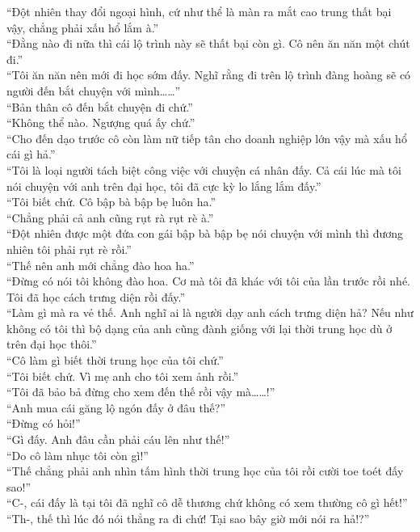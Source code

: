\documentclass[12pt,a4paper, twosides]{book}
\begin{document}
“Đột nhiên thay đổi ngoại hình, cứ như thể là màn ra mắt cao trung thất bại vậy, chẳng phải xấu hổ lắm à.”\\
“Đằng nào đi nữa thì cái lộ trình này sẽ thất bại còn gì. Cô nên ăn năn một chút đi.”\\
“Tôi ăn năn nên mới đi học sớm đấy. Nghĩ rằng đi trên lộ trình đàng hoàng sẽ có người đến bắt chuyện với mình……”\\
“Bản thân cô đến bắt chuyện đi chứ.”\\
“Không thể nào. Ngượng quá ấy chứ.”\\
“Cho đến dạo trước cô còn làm nữ tiếp tân cho doanh nghiệp lớn vậy mà xấu hổ cái gì hả.”\\
“Tôi là loại người tách biệt công việc với chuyện cá nhân đấy. Cả cái lúc mà tôi nói chuyện với anh trên đại học, tôi đã cực kỳ lo lắng lắm đấy.”\\
“Tôi biết chứ. Cô bập bà bập bẹ luôn ha.”\\
“Chẳng phải cả anh cũng rụt rà rụt rè à.”\\
“Đột nhiên được một đứa con gái bập bà bập bẹ nói chuyện với mình thì đương nhiên tôi phải rụt rè rồi.”\\
“Thế nên anh mới chẳng đào hoa ha.”\\
“Đừng có nói tôi không đào hoa. Cơ mà tôi đã khác với tôi của lần trước rồi nhé. Tôi đã học cách trưng diện rồi đấy.”\\
“Làm gì mà ra vẻ thế. Anh nghĩ ai là người dạy anh cách trưng diện hả? Nếu như không có tôi thì bộ dạng của anh cũng đành giống với lại thời trung học dù ở trên đại học thôi.”\\
“Cô làm gì biết thời trung học của tôi chứ.”\\
“Tôi biết chứ. Vì mẹ anh cho tôi xem ảnh rồi.”\\
“Tôi đã bảo bả đừng cho xem đến thế rồi vậy mà……!”\\
“Anh mua cái găng lộ ngón đấy ở đâu thế?”\\
“Đừng có hỏi!”\\
“Gì đấy. Anh đâu cần phải cáu lên như thế!”\\
“Do cô làm nhục tôi còn gì!”\\
“Thế chẳng phải anh nhìn tấm hình thời trung học của tôi rồi cười toe toét đấy sao!”\\
“C-, cái đấy là tại tôi đã nghĩ cô dễ thương chứ không có xem thường cô gì hết!”\\
“Th-, thế thì lúc đó nói thẳng ra đi chứ! Tại sao bây giờ mới nói ra hả!?”\\
\end{document}
